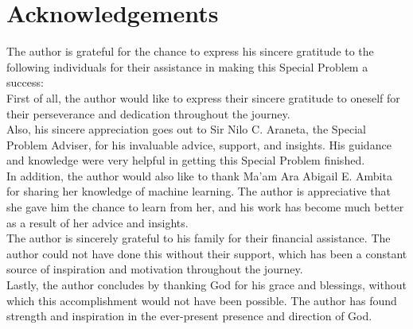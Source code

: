 \chapter{Acknowledgements}
\label{sec:appendix_e}
The author is grateful for the chance to express his sincere gratitude to the following 
individuals for their assistance in making this Special Problem a success:
\\

First of all, the author would like to express their sincere gratitude to oneself 
for their perseverance and dedication throughout the journey.
\\

Also, his sincere appreciation goes out to Sir Nilo C. Araneta, 
the Special Problem Adviser, for his invaluable advice, support, and insights. 
His guidance and knowledge were very helpful in getting this Special Problem finished.
\\

In addition, the author would also like to thank Ma'am Ara Abigail E. Ambita for 
sharing her knowledge of machine learning. The author is appreciative that she gave 
him the chance to learn from her, and his work has become much better as a result of her 
advice and insights.
\\

The author is sincerely grateful to his family for their financial assistance. 
The author could not have done this without their support, which has been a constant 
source of inspiration and motivation throughout the journey.
\\

Lastly, the author concludes by thanking God for his grace and blessings, without which this 
accomplishment would not have been possible. The author has found strength and inspiration 
in the ever-present presence and direction of God.
\\